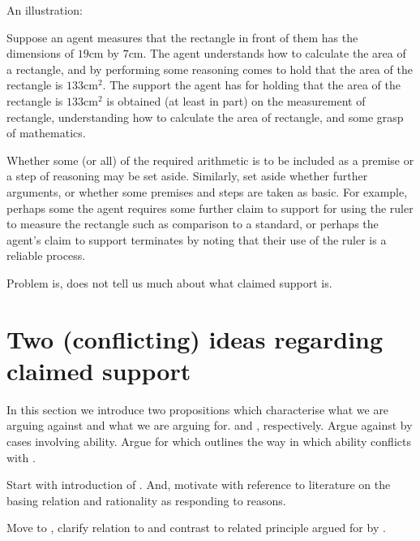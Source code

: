 \begin{note}
  An illustration:

  \begin{illustration}\label{ill:rectangle:basic}
    Suppose an agent measures that the rectangle in front of them has the dimensions of \(19\text{cm}\) by \(7\text{cm}\).
    The agent understands how to calculate the area of a rectangle, and by performing some reasoning comes to hold that the area of the rectangle is \(133\text{cm}^{2}\).
    The support the agent has for holding that the area of the rectangle is \(133\text{cm}^{2}\) is obtained (at least in part) on the measurement of rectangle, understanding how to calculate the area of rectangle, and some grasp of mathematics.
  \end{illustration}

  Whether some (or all) of the required arithmetic is to be included as a premise or a step of reasoning may be set aside.
  Similarly, set aside whether further arguments, or whether some premises and steps are taken as basic.
  For example, perhaps some the agent requires some further claim to support for using the ruler to measure the rectangle such as comparison to a standard, or perhaps the agent's claim to support terminates by noting that their use of the ruler is a reliable process.
\end{note}

\begin{note}
  \color{red}
  Problem is, \USE{} does not tell us much about what claimed support is.
\end{note}

\section{Two (conflicting) ideas regarding claimed support}
\label{sec:inter-with-claim}

\begin{note}
  In this section we introduce two propositions which characterise what we are arguing against and what we are arguing for.
  \ESU{-} and \EAS{-}, respectively.
  Argue against \ESU{} by cases involving ability.
  Argue for \EAS{} which outlines the way in which ability conflicts with \ESU{}.

  Start with introduction of \ESU{}.
  And, motivate with reference to literature on the basing relation and rationality as responding to reasons.

  Move to \EAS{}, clarify relation to \ESU{} and contrast to related principle argued for by \citeauthor{Moretti:2019wx}.
\end{note}

